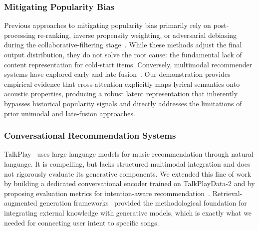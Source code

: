 \documentclass[]{ceurart}
\begin{document}
\subsubsection{Mitigating Popularity Bias}
Previous approaches to mitigating popularity bias primarily rely on
post-processing re-ranking, inverse propensity weighting, or adversarial
debiasing during the collaborative-filtering
stage~\cite{kaminskas2016diversity}. While these methods adjust the final
output distribution, they do not solve the root cause: the fundamental lack of
content representation for cold-start items. Conversely, multimodal recommender
systems have explored early and late fusion~\cite{baltruvsaitis2019multimodal}.
Our demonstration provides empirical evidence that cross-attention explicitly
maps lyrical semantics onto acoustic properties, producing a robust latent
representation that inherently bypasses historical popularity signals and
directly addresses the limitations of prior unimodal and late-fusion
approaches.

\subsubsection{Conversational Recommendation Systems}
TalkPlay~\cite{choi2025talkplaydata2} uses large language models for music
recommendation through natural language. It is compelling, but lacks structured
multimodal integration and does not rigorously evaluate its generative
components. We extended this line of work by building a dedicated
conversational encoder trained on TalkPlayData-2 and by proposing evaluation
metrics for intention-aware
recommendation~\cite{gao2021advances,christakopoulou2016conversational}.
Retrieval-augmented
generation frameworks~\cite{lewis2020rag,gao2023rag} provided the
methodological foundation for integrating external knowledge with generative
models, which is exactly what we needed for connecting user intent to specific
songs.
\end{document}
